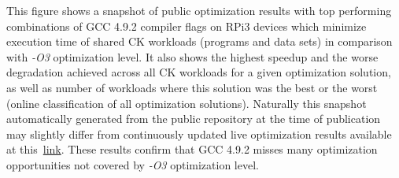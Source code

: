 This figure shows a snapshot of public optimization results 
with top performing combinations of GCC 4.9.2 compiler flags
on RPi3 devices which minimize execution time of shared CK workloads 
(programs and data sets) in comparison with \textit{-O3} optimization level.
%
It also shows the highest speedup and the worse degradation achieved
across all CK workloads for a given optimization solution, as well
as number of workloads where this solution was the best or the worst
(online classification of all optimization solutions).
%
Naturally this snapshot automatically generated from the public repository 
at the time of publication may slightly differ from continuously updated 
live optimization results available at this~\href{http://cknowledge.org/repo/web.php?template=cknowledge&wcid=8289e0cf24346aa7:d24a4fde9f120e10}{link}.
%
These results confirm that GCC 4.9.2 misses many optimization opportunities 
not covered by \textit{-O3} optimization level.

